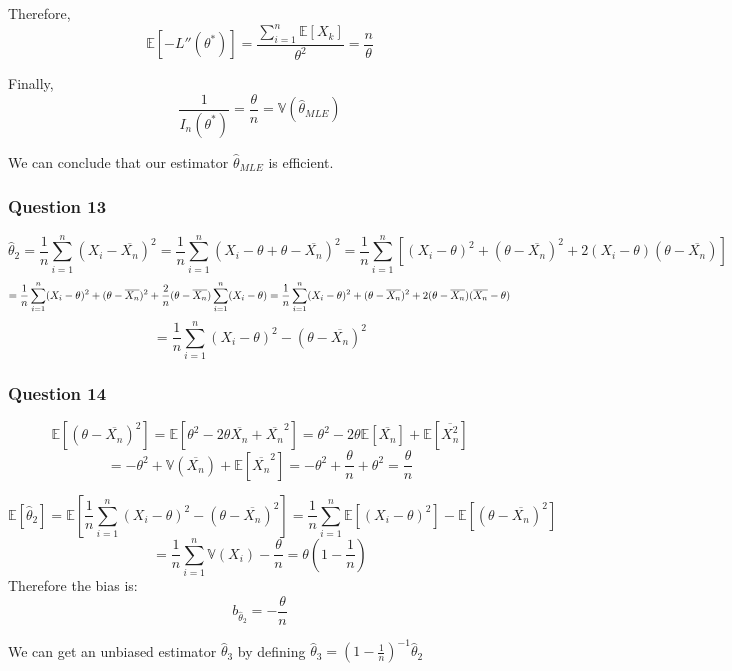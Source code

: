 \documentclass[]{article}
\begin{document}
Therefore,
\[\mathbb{E} [-L''(\theta^*)] = \frac{\sum_{i=1}^{n} \mathbb{E}[X_k]}{\theta^2} = \frac{n}{\theta}\]

Finally,
\[\frac{1}{I_n(\theta^*)} = \frac{\theta}{n} = \mathbb{V} (\hat\theta_{MLE})\]

We can conclude that our estimator \(\hat\theta_{MLE}\) is efficient.

\hypertarget{question-13}{%
\subsubsection{Question 13}\label{question-13}}

\[
\hat\theta_{2} = \frac{1}{n} \sum_{i=1}^{n} (X_i - \overline{X_n})^2 = \frac{1}{n} \sum_{i=1}^{n} (X_i - \theta + \theta - \overline{X_n})^2 = \frac{1}{n} \sum_{i=1}^{n} [(X_i - \theta)^2 + (\theta - \overline{X_n} )^2 +2(X_i - \theta)(\theta - \overline{X_n})]
\] \[
= \frac{1}{n} \sum_{i=1}^{n} (X_i - \theta)^2 + (\theta - \overline{X_n} )^2  + \frac{2}{n}(\theta - \overline{X_n}) \sum_{i=1}^{n}(X_i - \theta) \\ 
= \frac{1}{n} \sum_{i=1}^{n} (X_i - \theta)^2 + (\theta - \overline{X_n} )^2 + 2(\theta - \overline{X_n}) (\overline{X_n} - \theta ) 
\] \[
= \frac{1}{n} \sum_{i=1}^{n} (X_i - \theta)^2 - (\theta - \overline{X_n})^2
\]

\hypertarget{question-14}{%
\subsubsection{Question 14}\label{question-14}}

\[
\mathbb{E}[(\theta - \overline{X_n})^2] = \mathbb{E}[\theta^2 - 2\theta\overline{X_n} + \overline{X_n}^2] = \theta^2 - 2\theta\mathbb{E}[\overline{X_n}] + \mathbb{E}[\overline{X_n^2}]
\] \[
=- \theta^2 + \mathbb{V}(\overline{X_n}) + \mathbb{E}[\overline{X_n}^2] = - \theta^2 + \frac{\theta}{n} + \theta^2 = \frac{\theta}{n}
\]

\[
\mathbb{E}[\hat\theta_2] = \mathbb{E} [\frac{1}{n} \sum_{i=1}^{n} (X_i - \theta)^2 - (\theta - \overline{X_n})^2] = \frac{1}{n} \sum_{i=1}^{n}\mathbb{E}[(X_i - \theta)^2] - \mathbb{E}[(\theta - \overline{X_n})^2]
\]
\[= \frac{1}{n} \sum_{i=1}^{n}\mathbb{V}(X_i) - \frac{\theta}{n} = \theta(1-\frac{1}{n})\]
Therefore the bias is: \[b_{\hat\theta_2} =  -\frac{\theta}{n}\]

We can get an unbiased estimator \(\hat\theta_3\) by defining
\(\hat\theta_3 = (1-\frac{1}{n}) ^{-1} \hat\theta_2\)
\end{document}
